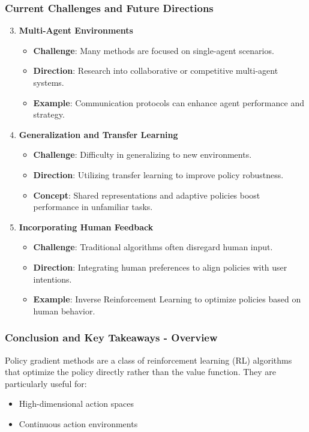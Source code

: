 \documentclass[aspectratio=169]{beamer}
\begin{document}
\begin{frame}[fragile]
    \frametitle{Current Challenges and Future Directions}
    \begin{enumerate}
        \setcounter{enumi}{2} %
        \item \textbf{Multi-Agent Environments}
        \begin{itemize}
            \item \textbf{Challenge}: Many methods are focused on single-agent scenarios.
            \item \textbf{Direction}: Research into collaborative or competitive multi-agent systems.
            \item \textbf{Example}: Communication protocols can enhance agent performance and strategy.
        \end{itemize}
        
        \item \textbf{Generalization and Transfer Learning}
        \begin{itemize}
            \item \textbf{Challenge}: Difficulty in generalizing to new environments.
            \item \textbf{Direction}: Utilizing transfer learning to improve policy robustness.
            \item \textbf{Concept}: Shared representations and adaptive policies boost performance in unfamiliar tasks.
        \end{itemize}
        
        \item \textbf{Incorporating Human Feedback}
        \begin{itemize}
            \item \textbf{Challenge}: Traditional algorithms often disregard human input.
            \item \textbf{Direction}: Integrating human preferences to align policies with user intentions.
            \item \textbf{Example}: Inverse Reinforcement Learning to optimize policies based on human behavior.
        \end{itemize}
    \end{enumerate}
\end{frame}

\begin{frame}[fragile]
    \frametitle{Conclusion and Key Takeaways - Overview}
    Policy gradient methods are a class of reinforcement learning (RL) algorithms that optimize the policy directly rather than the value function. They are particularly useful for:

    \begin{itemize}
        \item High-dimensional action spaces
        \item Continuous action environments
    \end{itemize}
\end{frame}
\end{document}
